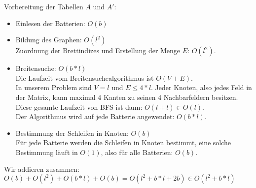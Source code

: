 \documentclass[a4paper,10pt,ngerman]{scrartcl}
\begin{document}
Vorbereitung der Tabellen $A$ und $A'$:
\begin{itemize}
  \item Einlesen der Batterien: $O(b)$
  \item Bildung des Graphen: $O(l^2)$\\
  Zuordnung der Brettindizes und Erstellung der Menge $E$: $O(l^2)$.
  \item Breitensuche: $O(b*l)$\\
  Die Laufzeit vom Breitensuchealgorithmus ist $O(V + E)$.\cite{cormen:BFS}\\
  In unserem Problem sind $V = l$ und $E \leqslant 4*l$.
  Jeder Knoten, also jedes Feld in der Matrix, kann maximal 4 Kanten zu seinen 4 Nachbarfeldern besitzen.\\
  Diese gesamte Laufzeit von BFS ist dann: $O(l+l)\in O(l)$.\\
  Der Algorithmus wird auf jede Batterie angewendet: $O(b*l)$.
  \item Bestimmung der Schleifen in Knoten: $O(b)$\\
  Für jede Batterie werden die Schleifen in Knoten bestimmt, eine solche Bestimmung läuft in $O(1)$,
  also für alle Batterien: $O(b)$.
\end{itemize}

Wir addieren zusammen:\\
$O(b) + O(l^2) + O(b*l) + O(b) = O(l^2 + b*l + 2b) \in O(l^2 + b*l)$\\
\end{document}

